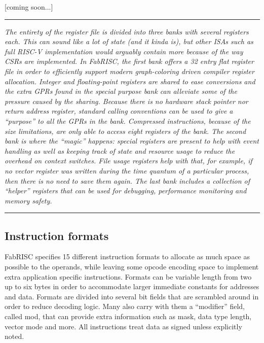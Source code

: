             \vspace{10pt}

            [coming soon...]

        \par\noindent\rule{\textwidth}{0.4pt}
        \textit{The entirety of the register file is divided into three banks with several registers each. This can sound like a lot of state (and it kinda is), but other ISAs such as full RISC-V implementation would arguably contain more because of the way CSRs are implemented. In FabRISC, the first bank offers a 32 entry flat register file in order to efficiently support modern graph-coloring driven compiler register allocation. Integer and floating-point registers are shared to ease conversions and the extra GPRs found in the special purpose bank can alleviate some of the pressure caused by the sharing. Because there is no hardware stack pointer nor return address register, standard calling conventions can be used to give a ``purpose'' to all the GPRs in the bank. Compressed instructions, because of the size limitations, are only able to access eight registers of the bank. The second bank is where the ``magic'' happens: special registers are present to help with event handling as well as keeping track of state and resource usage to reduce the overhead on context switches. File usage registers help with that, for example, if no vector register was written during the time quantum of a particular process, then there is no need to save them again. The last bank includes a collection of ``helper'' registers that can be used for debugging, performance monitoring and memory safety.}
        \par\noindent\rule{\textwidth}{0.4pt}

        \subsection{Instruction formats}

            \vspace{10pt}

            FabRISC specifies 15 different instruction formats to allocate as much space as possible to the operands, while leaving some opcode encoding space to implement extra application specific instructions. Formats can be variable length from two up to six bytes in order to accommodate larger immediate constants for addresses and data. Formats are divided into several bit fields that are scrambled around in order to reduce decoding logic. Many also carry with them a ``modifier'' field, called mod, that can provide extra information such as mask, data type length, vector mode and more. All instructions treat data as signed unless explicitly noted.


